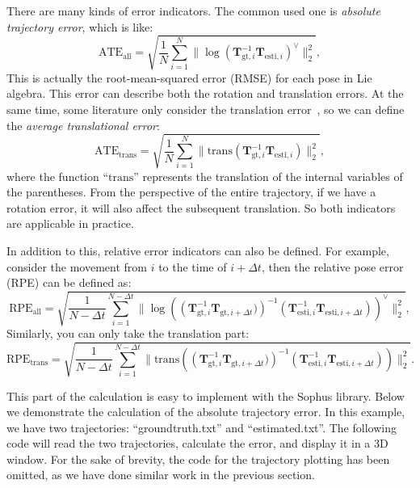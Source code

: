 There are many kinds of error indicators. The common used one is \textit{absolute trajectory error}, which is like:
\begin{equation}
\mathrm{ATE}_{\mathrm{all}} = \sqrt{ \frac{1}{N} \sum_{i=1}^N \| \log( \mathbf{T}_{\mathrm{gt },i}^{-1} \mathbf{T}_{\mathrm{esti},i} )^{\vee} \|_2^2},
\end{equation}
This is actually the root-mean-squared error (RMSE) for each pose in Lie algebra. This error can describe both the rotation and translation errors. At the same time, some literature only consider the translation error~\cite{Sturm2012}, so we can define the \textit{average translational error}:
\begin{equation}
\mathrm{ATE}_{\mathrm{trans}} = \sqrt{ \frac{1}{N} \sum_{i=1}^N \| \mathrm{trans}( \mathbf{T}_{\mathrm{gt},i}^{-1} \mathbf{T}_{\mathrm{esti},i} ) \|_2^2},
\end{equation}
where the function ``$\mathrm{trans}$'' represents the translation of the internal variables of the parentheses. From the perspective of the entire trajectory, if we have a rotation error, it will also affect the subsequent translation. So both indicators are applicable in practice.

In addition to this, relative error indicators can also be defined. For example, consider the movement from $i$ to the time of $i+\Delta t$, then the relative pose error (RPE) can be defined as:
\begin{equation}
\mathrm{RPE}_{\mathrm{all}} = \sqrt{ \frac{1}{N-\Delta t} \sum_{i=1}^{N-\Delta t} \| \log \left ( \left(\mathbf{T}_{\mathrm{gt},i}^{-1} \mathbf{T}_{\mathrm{gt},i+\Delta t} )\right)^{-1 } \left(\mathbf{T}_{\mathrm{esti},i}^{-1} \mathbf{T}_{\mathrm{esti},i+\Delta t}\right)\right)^{ \vee} \|_2^2},
\end{equation}
Similarly, you can only take the translation part:
\begin{equation}
\mathrm{RPE}_{\mathrm{trans}} = \sqrt{ \frac{1}{N-\Delta t} \sum_{i=1}^{N-\Delta t} \| \mathrm{trans } \left( \left(\mathbf{T}_{\mathrm{gt},i}^{-1} \mathbf{T}_{\mathrm{gt},i+\Delta t} )\right)^ {-1} \left(\mathbf{T}_{\mathrm{esti},i}^{-1} \mathbf{T}_{\mathrm{esti},i+\Delta t}\right)\right ) \|_2^2}.
\end{equation}

This part of the calculation is easy to implement with the Sophus library. Below we demonstrate the calculation of the absolute trajectory error. In this example, we have two trajectories: ``groundtruth.txt'' and ``estimated.txt''. The following code will read the two trajectories, calculate the error, and display it in a 3D window. For the sake of brevity, the code for the trajectory plotting has been omitted, as we have done similar work in the previous section.
    
